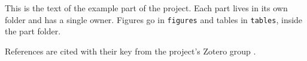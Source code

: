 
This is the text of the example part of the project.
Each part lives in its own folder and has a single owner.
Figures go in \texttt{figures} and tables in \texttt{tables}, inside the part folder.

References are cited with their key from the project's Zotero group \parencite{knuthTeXbook1984}.
